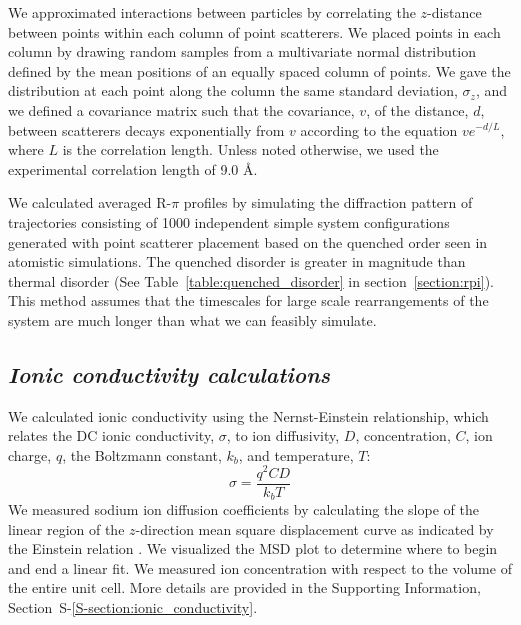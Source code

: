 \documentclass[journal=jpcbfk,manuscript=article]{achemso}
\begin{document}
  We approximated interactions between particles by correlating the $z$-distance 
  between points within each column of point scatterers. We placed points in each
  column by drawing random samples from a multivariate normal distribution defined
  by the mean positions of an equally spaced column of points. We gave the 
  distribution at each point along the column the same standard deviation, 
  $\sigma_z$, and we defined a covariance matrix such that the covariance, $v$, of
  the distance, $d$, between scatterers decays exponentially from $v$ according
  to the equation $ve^{-d/L}$, where $L$ is the correlation length. Unless noted
  otherwise, we used the experimental correlation length of 9.0 \AA. 
  
  We calculated averaged R-$\pi$ profiles by simulating the diffraction pattern
  of trajectories consisting of 1000 independent simple system configurations 
  generated with point scatterer placement based on the quenched order seen in
  atomistic simulations. The quenched disorder is greater in  magnitude than thermal 
  disorder (See Table~\ref{table:quenched_disorder} in section~\ref{section:rpi}).
  This method assumes that the timescales for large scale rearrangements of the
  system are much longer than what we can feasibly simulate.

  \subsection{\textit{Ionic conductivity calculations}}

  We calculated ionic conductivity using the Nernst-Einstein relationship, which 
  relates the DC ionic conductivity, $\sigma$, to ion diffusivity, $D$, 
  concentration, $C$, ion charge, $q$, the Boltzmann constant, $k_b$, and 
  temperature, $T$: 
  \begin{equation}
	\sigma = \dfrac{q^2CD}{k_b T} 
	\label{eqn:nernst_einstein}
  \end{equation}
  We measured sodium ion diffusion coefficients by calculating the slope
  of the linear region of the $z$-direction mean square displacement curve as
  indicated by the Einstein relation \cite{einstein_investigations_1956}. We
  visualized the MSD plot to determine where to begin and end a linear fit. We
  measured ion concentration with respect to the volume of the entire unit cell. 
  More details are provided in the Supporting Information, Section~S-\ref{S-section:ionic_conductivity}.
\end{document}
